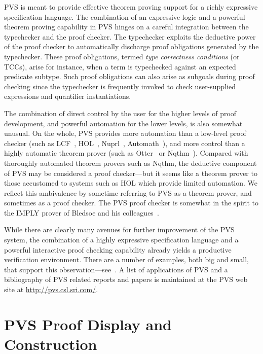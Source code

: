 \documentclass[12pt]{book}
\begin{document}
PVS is meant to provide effective theorem proving support for a richly
expressive specification language.  The combination of an expressive logic
and a powerful theorem proving capability in PVS hinges on a careful
integration between the typechecker and the proof checker.  The
typechecker exploits the deductive power of the proof checker to
automatically discharge proof obligations generated by the typechecker.
These proof obligations, termed \emph{type correctness conditions} (or
TCCs), arise for instance, when a term is typechecked against
an expected predicate subtype.  Such proof obligations can also arise as
subgoals during proof checking since the typechecker is frequently invoked
to check user-supplied expressions and quantifier instantiations.

The combination of direct control by the user for the higher levels of
proof development, and powerful automation for the lower levels, is also
somewhat unusual.  On the whole, PVS provides more automation than a
low-level proof checker (such as LCF~\cite{LCF},
HOL~\cite{Gordon:HOL88}, Nuprl~\cite{Nuprl-book},
Automath~\cite{deBruijn80}), and more control than a
highly automatic theorem prover (such as Otter~\cite{Otter90}
or Nqthm~\cite{Boyer-Moore79,Boyer-Moore88}).  Compared with
thoroughly automated theorem provers such as Nqthm, the
deductive component of PVS may be considered a proof checker---but it
seems like a theorem prover to those accustomed to systems such as
HOL which provide limited automation.  We reflect this
ambivalence by sometime referring to PVS as a theorem prover, and
sometimes as a proof checker.  The PVS proof checker is somewhat in the
spirit to the IMPLY prover of Bledsoe and his colleagues~\cite{Bledsoe74}.

While there are clearly many avenues for further improvement of the PVS
system, the combination of a highly expressive specification language and
a powerful interactive proof checking capability already yields a
productive verification environment.  There are a number of examples, both
big and small, that support this
observation---see~\cite{Owre-etal98:FM-TRENDS}.  A list of applications of
PVS and a bibliography of PVS related reports and papers is maintained at
the PVS web site at \url{http://pvs.csl.sri.com/}.



\section{PVS Proof Display and Construction}
\end{document}
